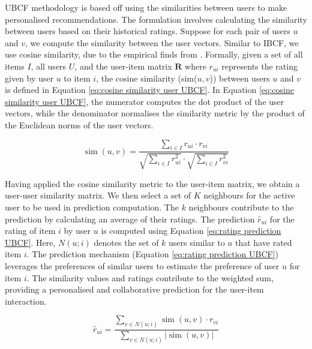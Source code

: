 UBCF methodology is based off using the similarities between users to make personalised recommendations. The formulation involves calculating the similarity between users based on their historical ratings. Suppose for each pair of users $u$ and $v$, we compute the similarity between the user vectors. Similar to IBCF, we use cosine similarity, due to the empirical finds from \cite{herlocker2002empirical}.  Formally, given a set of all
items $I$, all users $U$, and the user-item matrix $\mathbf{R}$ where $r_{ui}$ represents the rating given by user $u$ to item
$i$, the cosine similarity (sim($u,v$)) between users $u$ and $v$ is defined in Equation \ref{eq:cosine similarity user UBCF}. In Equation \ref{eq:cosine similarity user UBCF}, the numerator computes the dot product of the user vectors, while the denominator normalises the similarity metric by the product of the Euclidean norms of the user vectors.

\begin{equation}
    \operatorname{sim}(u, v)=\frac{\sum_{i \in I} r_{u i} \cdot r_{v i}}{\sqrt{\sum_{i \in I} r_{u i}^2} \cdot \sqrt{\sum_{i \in I} r_{v i}^2}}
    \label{eq:cosine similarity user UBCF}
\end{equation}

Having applied the cosine similarity metric to the user-item matrix, we obtain a user-user similarity matrix. We then select a set of $K$ neighbours for the active user to be used in prediction computation. The $k$ neighbours contribute to the prediction by calculating an average of their ratings. The prediction $\hat{r}_{u i}$ for the rating of item $i$ by user $u$ is computed using Equation \ref{eq:rating prediction UBCF}. Here, $N(u ; i)$ denotes the set of $k$ users similar to $u$ that have rated item $i$. The prediction mechanism (Equation \ref{eq:rating prediction UBCF}) leverages the preferences of similar users to estimate the preference of user $u$ for item $i$. The similarity values and ratings contribute to the weighted sum, providing a personalised and collaborative prediction for the user-item interaction.

\begin{equation}
    \hat{r}_{u i} = \frac{\sum_{v \in N(u ; i)} \operatorname{sim}(u, v) \cdot r_{v i}}{\sum_{v \in N(u ; i)}|\operatorname{sim}(u, v)|}
    \label{eq:rating prediction UBCF}
\end{equation}
    
